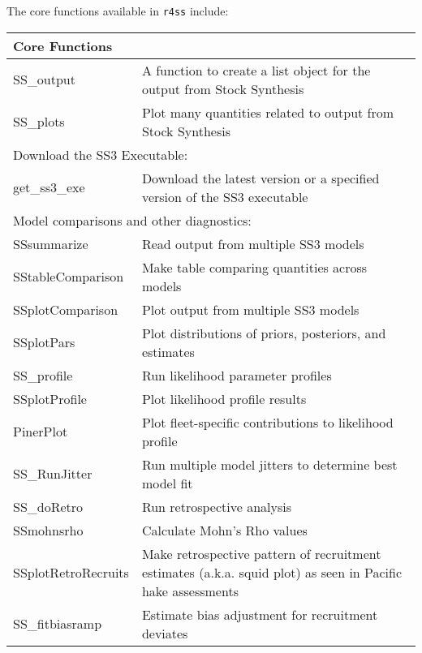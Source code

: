 The core functions available in \texttt{r4ss} include:
\begin{center}
	\begin{longtable}{p{4.5cm} p{10.52cm}}
		\hline
		Core Functions & \Tstrut\Bstrut\\
		\hline
		SS\_output \Tstrut & A function to create a list object for the output from Stock Synthesis \\
		SS\_plots  \Tstrut & Plot many quantities related to output from Stock Synthesis \\
		\hline
		
		\multicolumn{2}{l}{Download the SS3 Executable:} \Tstrut\Bstrut\\
		\hline
		get\_ss3\_exe \Tstrut & Download the latest version or a specified version of the SS3 executable \\
		\hline
	
		\multicolumn{2}{l}{Model comparisons and other diagnostics:} \Tstrut\Bstrut\\
		\hline
		SSsummarize   \Tstrut & Read output from multiple SS3 models \\
		SStableComparison \Tstrut & Make table comparing quantities across models \\
		SSplotComparison \Tstrut & Plot output from multiple SS3 models \\
		SSplotPars    \Tstrut & Plot distributions of priors, posteriors, and estimates \\
		SS\_profile \Tstrut & Run likelihood parameter profiles \\
		SSplotProfile \Tstrut & Plot likelihood profile results \\
		PinerPlot     \Tstrut & Plot fleet-specific contributions to likelihood profile \\
		SS\_RunJitter \Tstrut & Run multiple model jitters to determine best model fit \\
		SS\_doRetro \Tstrut & Run retrospective analysis \\
		SSmohnsrho \Tstrut & Calculate Mohn's Rho values \\
		SSplotRetroRecruits \Tstrut & Make retrospective pattern of recruitment estimates (a.k.a. squid plot) as seen in Pacific hake assessments\Bstrut \\
		SS\_fitbiasramp \Tstrut& Estimate bias adjustment for recruitment deviates \Bstrut\\
		\hline
		

\end{longtable}
\end{center}
